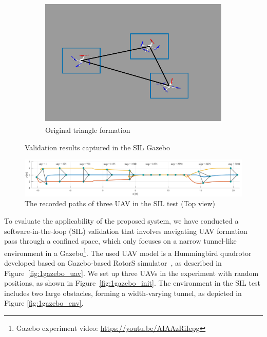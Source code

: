 \begin{figure}[!]
\begin{subfigure}[b]{0.48\textwidth}
    \includegraphics[width=\textwidth]{paper2/images/gazebo_res6.pdf}
    \caption{Original triangle formation}
    \label{fig:1gazebo_6}
    \end{subfigure}
    \caption{Validation results captured in the SIL Gazebo}
    \label{fig:1gazebo_result}
\end{figure}

\begin{figure}[!]
    \centering
    \includegraphics[width=\textwidth]{paper2/images/gazebo_path.pdf}
    \caption{The recorded paths of three UAV in the SIL test (Top view)}
    \label{fig:1gazebo_path}
\end{figure}

To evaluate the applicability of the proposed system, we have conducted a software-in-the-loop (SIL) validation that involves navigating UAV formation pass through a confined space, which only focuses on a narrow tunnel-like environment in a Gazebo\footnote{Gazebo experiment video: {\selectfont
\url{https://youtu.be/AIAAzRiIepg}}}. The used UAV model is a Hummingbird quadrotor developed based on Gazebo-based RotorS simulator~\cite{Furrer2016}, as described in Figure~\ref{fig:1gazebo_uav}. We set up three UAVs in the experiment with random positions, as shown in Figure~\ref{fig:1gazebo_init}. The environment in the SIL test includes two large obstacles, forming a width-varying tunnel, as depicted in Figure \ref{fig:1gazebo_env}.

